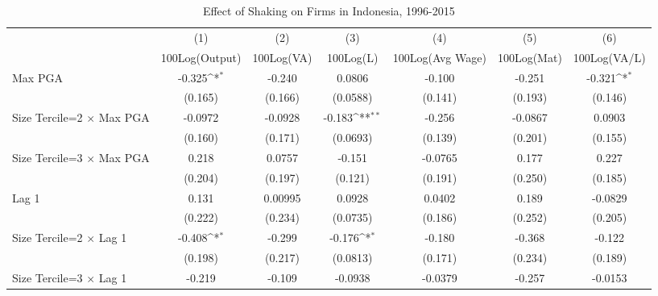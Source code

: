 \begin{table}[htbp]\centering
\def\sym#1{\ifmmode^{#1}\else\(^{#1}\)\fi}
\caption{Effect of Shaking on Firms in Indonesia, 1996-2015}
\begin{tabular}{l*{6}{c}}
\toprule
                &\multicolumn{1}{c}{(1)}&\multicolumn{1}{c}{(2)}&\multicolumn{1}{c}{(3)}&\multicolumn{1}{c}{(4)}&\multicolumn{1}{c}{(5)}&\multicolumn{1}{c}{(6)}\\
                &\multicolumn{1}{c}{100Log(Output)}&\multicolumn{1}{c}{100Log(VA)}&\multicolumn{1}{c}{100Log(L)}&\multicolumn{1}{c}{100Log(Avg Wage)}&\multicolumn{1}{c}{100Log(Mat)}&\multicolumn{1}{c}{100Log(VA/L)}\\
\midrule
Max PGA         &   -0.325\sym{*}  &   -0.240         &   0.0806         &   -0.100         &   -0.251         &   -0.321\sym{*}  \\
                &  (0.165)         &  (0.166)         & (0.0588)         &  (0.141)         &  (0.193)         &  (0.146)         \\
\addlinespace
Size Tercile=2 $\times$ Max PGA&  -0.0972         &  -0.0928         &   -0.183\sym{**} &   -0.256         &  -0.0867         &   0.0903         \\
                &  (0.160)         &  (0.171)         & (0.0693)         &  (0.139)         &  (0.201)         &  (0.155)         \\
\addlinespace
Size Tercile=3 $\times$ Max PGA&    0.218         &   0.0757         &   -0.151         &  -0.0765         &    0.177         &    0.227         \\
                &  (0.204)         &  (0.197)         &  (0.121)         &  (0.191)         &  (0.250)         &  (0.185)         \\
\addlinespace
Lag 1           &    0.131         &  0.00995         &   0.0928         &   0.0402         &    0.189         &  -0.0829         \\
                &  (0.222)         &  (0.234)         & (0.0735)         &  (0.186)         &  (0.252)         &  (0.205)         \\
\addlinespace
Size Tercile=2 $\times$ Lag 1&   -0.408\sym{*}  &   -0.299         &   -0.176\sym{*}  &   -0.180         &   -0.368         &   -0.122         \\
                &  (0.198)         &  (0.217)         & (0.0813)         &  (0.171)         &  (0.234)         &  (0.189)         \\
\addlinespace
Size Tercile=3 $\times$ Lag 1&   -0.219         &   -0.109         &  -0.0938         &  -0.0379         &   -0.257         &  -0.0153         \\

\end{tabular}
\end{table}
